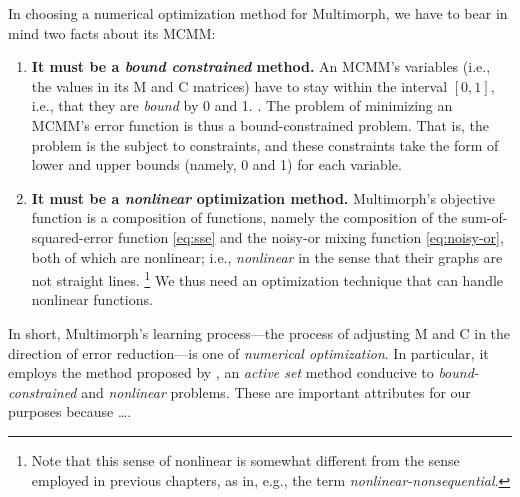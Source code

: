 In choosing a numerical optimization method for Multimorph, we have to bear in mind two
facts about its MCMM: 
\begin{enumerate}
\item \textbf{It must be a \emph{bound constrained} method.} An MCMM's variables (i.e., the values 
in its M and C matrices)
have to stay
within the interval $[0,1]$, i.e., that they are \emph{bound} by 0 and 1.  . 
The problem of minimizing an MCMM's error function is thus a bound-constrained problem. 
That is, the problem is the subject to constraints, and these constraints take the form of 
lower and upper bounds (namely, 0 and 1) for each variable.
\item \textbf{It must be a \emph{nonlinear} optimization method.}
Multimorph's objective function is a composition of functions, namely the composition of the sum-of-squared-error function \eqref{eq:sse} and the noisy-or mixing function \eqref{eq:noisy-or}, both of which are nonlinear; i.e., \emph{nonlinear} in the sense that their graphs are not straight lines. \footnote{Note that this sense of nonlinear is somewhat different from the sense employed in previous chapters, as in, e.g., the term \emph{nonlinear-nonsequential}.} We thus need an optimization technique that can handle nonlinear functions.
\end{enumerate} 

In short, Multimorph's learning process---the process of adjusting M and C in the direction of error reduction---is one of \emph{numerical optimization}. In particular, it employs the method proposed by
\citet{cheng-and-li:2012}, an \emph{active set} method conducive to \emph{bound-constrained} and \emph{nonlinear} problems. These are important attributes for our purposes because \dots.


